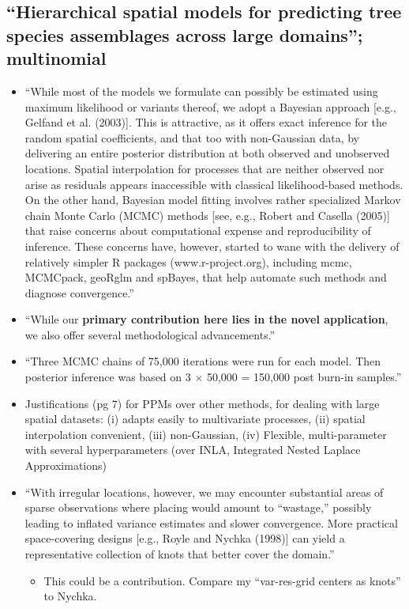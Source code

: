 \documentclass{article}
\begin{document}
\subsection*{``Hierarchical spatial models for predicting tree species assemblages across large domains''\citep{Finley2009_2}; multinomial}
\begin{itemize}
\item ``While most of the models we formulate can possibly be estimated using maximum likelihood or variants thereof, we adopt a Bayesian approach [e.g., Gelfand et al. (2003)]. This is attractive, as it offers exact inference for the random spatial coefficients, and that too with non-Gaussian data, by delivering an entire posterior distribution at both observed and unobserved locations. Spatial interpolation for processes that are neither observed nor arise as residuals appears inaccessible with classical likelihood-based methods. On the other hand, Bayesian model fitting involves rather specialized Markov chain Monte Carlo (MCMC) methods [see, e.g., Robert and Casella (2005)] that raise concerns about computational expense and reproducibility of inference. These concerns have, however, started to wane with the delivery of relatively simpler R packages (www.r-project.org), including mcmc, MCMCpack, geoRglm and spBayes, that help automate such methods and diagnose convergence.''
\item ``While our {\bf primary contribution here lies in the novel application}, we also offer several methodological advancements.''
\item ``Three MCMC chains of 75,000 iterations were run for each model. Then posterior inference was based on 3 $\times$ 50,000 = 150,000 post burn-in samples.''
\item Justifications (pg 7) for PPMs over other methods, for dealing with large spatial datasets: (i) adapts easily to multivariate processes, (ii) spatial interpolation convenient, (iii) non-Gaussian, (iv) Flexible, multi-parameter with several hyperparameters (over INLA, Integrated Nested Laplace Approximations)
\item ``With irregular locations, however, we may encounter substantial areas of sparse observations where placing would amount to “wastage,” possibly leading to inflated variance estimates and slower convergence. More practical space-covering designs [e.g., Royle and Nychka (1998)] can yield a representative collection of knots that better cover the domain.''
    \begin{itemize}
    \item This could be a contribution. Compare my ``var-res-grid centers as knots'' to Nychka.

\end{itemize}
\end{itemize}
\end{document}
